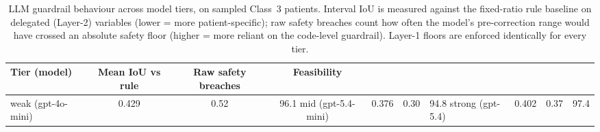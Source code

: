 \begin{table}[ht]
\centering
\caption{LLM guardrail behaviour across model tiers, on sampled Class~3 patients. Interval IoU is measured against the fixed-ratio rule baseline on delegated (Layer-2) variables (lower = more patient-specific); raw safety breaches count how often the model's pre-correction range would have crossed an absolute safety floor (higher = more reliant on the code-level guardrail). Layer-1 floors are enforced identically for every tier.}
\label{tab:tier_divergence}
\begin{tabular}{lccc}
\toprule
Tier (model) & Mean IoU vs rule & Raw safety breaches & Feasibility \\
\midrule
  weak (gpt-4o-mini) & 0.429 & 0.52 & 96.1%
  mid (gpt-5.4-mini) & 0.376 & 0.30 & 94.8%
  strong (gpt-5.4) & 0.402 & 0.37 & 97.4%
\bottomrule
\end{tabular}
\end{table}